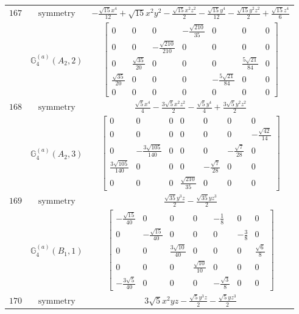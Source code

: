 \documentclass[fleqn,8pt,landscape]{jsarticle}
\begin{document}
\begin{longtable}{ccc}
$ 167 $ & $ \text{symmetry} $ & $ - \frac{\sqrt{15} x^{4}}{12} + \sqrt{15} x^{2} y^{2} - \frac{\sqrt{15} x^{2} z^{2}}{2} - \frac{\sqrt{15} y^{4}}{12} - \frac{\sqrt{15} y^{2} z^{2}}{2} + \frac{\sqrt{15} z^{4}}{6} $ \\
$  $ & $ \mathbb{G}_{4}^{(a)}(A_{2},2) $ & $ \begin{bmatrix} 0 & 0 & 0 & - \frac{\sqrt{210}}{35} & 0 & 0 & 0 \\ 0 & 0 & - \frac{\sqrt{210}}{210} & 0 & 0 & 0 & 0 \\ 0 & \frac{\sqrt{35}}{20} & 0 & 0 & 0 & \frac{5 \sqrt{21}}{84} & 0 \\ \frac{\sqrt{35}}{20} & 0 & 0 & 0 & - \frac{5 \sqrt{21}}{84} & 0 & 0 \\ 0 & 0 & 0 & 0 & 0 & 0 & 0 \end{bmatrix} $ \\ \hline
$ 168 $ & $ \text{symmetry} $ & $ \frac{\sqrt{5} x^{4}}{4} - \frac{3 \sqrt{5} x^{2} z^{2}}{2} - \frac{\sqrt{5} y^{4}}{4} + \frac{3 \sqrt{5} y^{2} z^{2}}{2} $ \\
$  $ & $ \mathbb{G}_{4}^{(a)}(A_{2},3) $ & $ \begin{bmatrix} 0 & 0 & 0 & 0 & 0 & 0 & 0 \\ 0 & 0 & 0 & 0 & 0 & 0 & - \frac{\sqrt{42}}{14} \\ 0 & - \frac{3 \sqrt{105}}{140} & 0 & 0 & 0 & - \frac{\sqrt{7}}{28} & 0 \\ \frac{3 \sqrt{105}}{140} & 0 & 0 & 0 & - \frac{\sqrt{7}}{28} & 0 & 0 \\ 0 & 0 & 0 & \frac{\sqrt{210}}{35} & 0 & 0 & 0 \end{bmatrix} $ \\ \hline
$ 169 $ & $ \text{symmetry} $ & $ \frac{\sqrt{35} y^{3} z}{2} - \frac{\sqrt{35} y z^{3}}{2} $ \\
$  $ & $ \mathbb{G}_{4}^{(a)}(B_{1},1) $ & $ \begin{bmatrix} - \frac{\sqrt{15}}{40} & 0 & 0 & 0 & - \frac{1}{8} & 0 & 0 \\ 0 & - \frac{\sqrt{15}}{40} & 0 & 0 & 0 & - \frac{3}{8} & 0 \\ 0 & 0 & \frac{3 \sqrt{10}}{40} & 0 & 0 & 0 & \frac{\sqrt{6}}{8} \\ 0 & 0 & 0 & \frac{\sqrt{10}}{10} & 0 & 0 & 0 \\ - \frac{3 \sqrt{5}}{40} & 0 & 0 & 0 & - \frac{\sqrt{3}}{8} & 0 & 0 \end{bmatrix} $ \\ \hline
$ 170 $ & $ \text{symmetry} $ & $ 3 \sqrt{5} x^{2} y z - \frac{\sqrt{5} y^{3} z}{2} - \frac{\sqrt{5} y z^{3}}{2} $ \\

\end{longtable}
\end{document}
